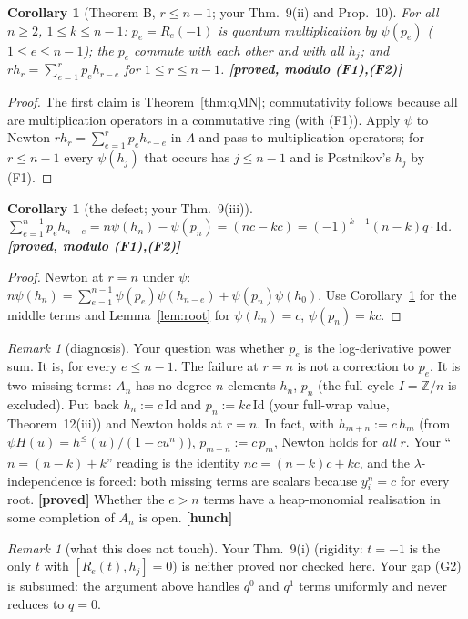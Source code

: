 \documentclass[11pt]{article}
\newtheorem{corollary}[theorem]{Corollary}
\theoremstyle{remark}
\newtheorem{remark}[theorem]{Remark}
\newcommand{\Z}{\mathbb{Z}}
\newcommand{\grade}[1]{\textbf{[#1]}}
\begin{document}
\begin{corollary}[Theorem B, $r\le n-1$; your Thm.~9(ii) and Prop.~10]\label{cor:B}
For all $n\ge2$, $1\le k\le n-1$: $p_e=R_e(-1)$ is quantum multiplication by $\psi(p_e)$ ($1\le e\le n-1$); the
$p_e$ commute with each other and with all $h_j$; and $r h_r=\sum_{e=1}^rp_eh_{r-e}$ for $1\le r\le n-1$.
\grade{proved, modulo (F1),(F2)}
\end{corollary}
\begin{proof}
The first claim is Theorem~\ref{thm:qMN}; commutativity follows because all are multiplication operators in a
commutative ring (with (F1)). Apply $\psi$ to Newton $rh_r=\sum_{e=1}^rp_eh_{r-e}$ in $\Lambda$ and pass to
multiplication operators; for $r\le n-1$ every $\psi(h_j)$ that occurs has $j\le n-1$ and is Postnikov's $h_j$ by (F1).
\end{proof}

\begin{corollary}[the defect; your Thm.~9(iii)]\label{cor:defect}
$\sum_{e=1}^{n-1}p_eh_{n-e}=n\psi(h_n)-\psi(p_n)=(nc-kc)=(-1)^{k-1}(n-k)q\cdot\mathrm{Id}$. \grade{proved, modulo (F1),(F2)}
\end{corollary}
\begin{proof}
Newton at $r=n$ under $\psi$: $n\psi(h_n)=\sum_{e=1}^{n-1}\psi(p_e)\psi(h_{n-e})+\psi(p_n)\psi(h_0)$. Use
Corollary~\ref{cor:B} for the middle terms and Lemma~\ref{lem:root} for $\psi(h_n)=c$, $\psi(p_n)=kc$.
\end{proof}

\begin{remark}[diagnosis]
Your question was whether $p_e$ is the log-derivative power sum. It is, for every $e\le n-1$. The failure at $r=n$ is not
a correction to $p_e$. It is two missing terms: $A_n$ has no degree-$n$ elements $h_n$, $p_n$ (the full cycle $I=\Z/n$ is
excluded). Put back $h_n:=c\,\mathrm{Id}$ and $p_n:=kc\,\mathrm{Id}$ (your full-wrap value, Theorem~12(iii)) and Newton
holds at $r=n$. In fact, with $h_{m+n}:=c\,h_m$ (from $\psi H(u)=h^{\le}(u)/(1-cu^n)$), $p_{m+n}:=c\,p_m$, Newton holds for
\emph{all} $r$. Your ``$n=(n-k)+k$'' reading is the identity $nc=(n-k)c+kc$, and the $\lambda$-independence is forced: both
missing terms are scalars because $y_i^n=c$ for every root. \grade{proved}
Whether the $e>n$ terms have a heap-monomial realisation in some completion of $A_n$ is open. \grade{hunch}
\end{remark}

\begin{remark}[what this does not touch]
Your Thm.~9(i) (rigidity: $t=-1$ is the only $t$ with $[R_e(t),h_j]=0$) is neither proved nor checked here. Your gap (G2) is
subsumed: the argument above handles $q^0$ and $q^1$ terms uniformly and never reduces to $q=0$.
\end{remark}
\end{document}
